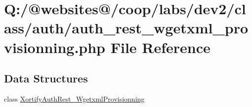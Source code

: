 \hypertarget{auth__rest__wgetxml__provisionning_8php}{\section{Q\-:/@websites@/coop/labs/dev2/class/auth/auth\-\_\-rest\-\_\-wgetxml\-\_\-provisionning.php File Reference}
\label{auth__rest__wgetxml__provisionning_8php}
}
\subsection*{Data Structures}
\begin{DoxyCompactItemize}
\item 
class \hyperlink{class_xortify_auth_rest___wgetxml_provisionning}{Xortify\-Auth\-Rest\-\_\-\-Wgetxml\-Provisionning}
\end{DoxyCompactItemize}
